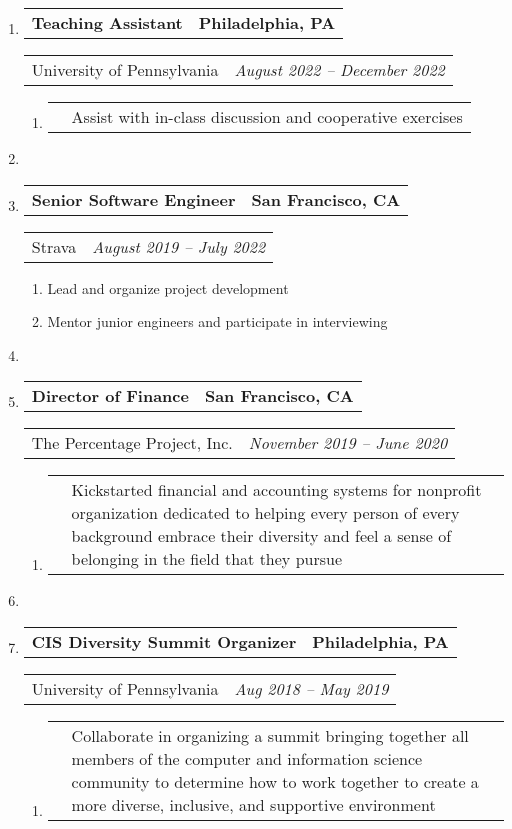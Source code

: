 \documentclass[letterpaper]{article}
\makeatletter
\newcommand*{\tabulardef}[3]{\begin{tabular}[t]{@{}lp{\dimexpr\linewidth-#1}@{}}
    #2&#3
\end{tabular}}
\newcommand{\headerrow}[2]
{\begin{tabular*}{\linewidth}{l@{\extracolsep{\fill}}r}
	#1 &
	#2 \\
\end{tabular*}}
\makeatother
\begin{document}
\begin{enumerate}[label=]	
	\parskip=-0.25em

	\item
		\headerrow
			{\textbf{Teaching Assistant}}
            {\textbf{Philadelphia, PA}}
	\headerrow
        {University of Pennsylvania}
		{\emph{August 2022 -- December 2022}}
	\begin{enumerate}[label= *]
		\parskip=-0.1em
        \item\tabulardef{5cm}{}{Assist with in-class discussion and cooperative exercises}
	\end{enumerate}

    \item

	\item
		\headerrow
			{\textbf{Senior Software Engineer}}
			{\textbf{San Francisco, CA}}
	\headerrow
		{Strava}
		{\emph{August 2019 -- July 2022}}
	\begin{enumerate}[label= *]
	\parskip=-0.1em
        \item Lead and organize project development
        \item Mentor junior engineers and participate in interviewing
	\end{enumerate}

   \item

   \item
       \headerrow
           {\textbf{Director of Finance}}
           {\textbf{San Francisco, CA}}
       \headerrow
           {The Percentage Project, Inc.}
           {\emph{November 2019 -- June 2020}}
       \begin{enumerate}[label= *]
       \parskip=-0.1em
           \item\tabulardef{5cm}{}{Kickstarted financial and accounting systems for nonprofit organization
                dedicated to helping every person of every background embrace their diversity and feel a sense of belonging in
                the field that they pursue}
       \end{enumerate}

    \item

       \item
               \headerrow
                       {\textbf{CIS Diversity Summit Organizer}}
                       {\textbf{Philadelphia, PA}}
       \headerrow
               {University of Pennsylvania}
               {\emph{Aug 2018 -- May 2019}}
       \begin{enumerate}[label= *]
       \parskip=-0.1em
               \item\tabulardef{5cm}{}{Collaborate in organizing a summit bringing together all members of the
 computer and information science community to determine how to work together to create a more diverse, inclusive, and supportive environment}
       \end{enumerate}


\end{enumerate}
\end{document}
